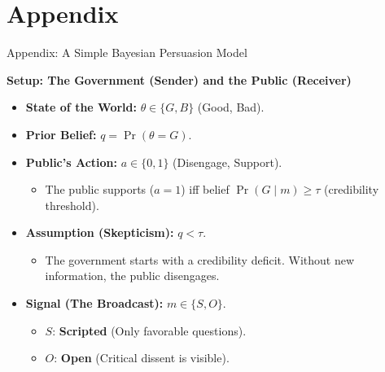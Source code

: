 \documentclass[10pt,aspectratio=169]{beamer}
\begin{document}
\begin{frame}[allowframebreaks]
    \printbibliography
\end{frame}


\appendix

\section*{Appendix}

\begin{frame}{Appendix: A Simple Bayesian Persuasion Model}
\hypertarget{appmodel}{}
\label{appmodel}

\textbf{Setup: The Government (Sender) and the Public (Receiver)}

\begin{itemize}
    \setlength\itemsep{0.8em}
    \item \textbf{State of the World:} $\theta \in \{G, B\}$ (Good, Bad).
    \item \textbf{Prior Belief:} $q = \Pr(\theta = G)$.
    \item \textbf{Public's Action:} $a \in \{0, 1\}$ (Disengage, Support).
    \begin{itemize}
        \item The public supports ($a=1$) iff belief $\Pr(G \mid m) \ge \tau$ (credibility threshold).
    \end{itemize}
    \item \textbf{Assumption (Skepticism):} $q < \tau$. 
    \begin{itemize}
        \item \footnotesize{The government starts with a credibility deficit. Without new information, the public disengages.}
    \end{itemize}
    \item \textbf{Signal (The Broadcast):} $m \in \{S, O\}$.
    \begin{itemize}
        \item $S$: \textbf{Scripted} (Only favorable questions).
        \item $O$: \textbf{Open} (Critical dissent is visible).
    \end{itemize}
\end{itemize}

\end{frame}
\end{document}
